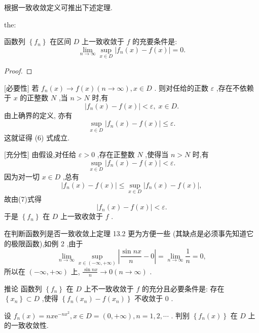根据一致收敛定义可推出下述定理.

\begin{theorem}{}{the:}

\end{theorem}
 函数列 \(\left\{  {f}_{n}\right\}\) 在区间 \(D\) 上一致收敛于 \(f\) 的充要条件是:
\[
\mathop{\lim }\limits_{{n \rightarrow  \infty }}\mathop{\sup }\limits_{{x \in  D}}\left| {{f}_{n}\left( x\right)  - f\left( x\right) }\right|  = 0. \tag{6}
\]
\begin{proof}

\end{proof}
[必要性] 若 \({f}_{n}\left( x\right)  \rightarrow  f\left( x\right) \left( {n \rightarrow  \infty }\right) ,x \in  D\) . 则对任给的正数 \(\varepsilon\) ,存在不依赖于 \(x\) 的正整数 \(N\) ,当 \(n > N\) 时,有
\[
\left| {{f}_{n}\left( x\right)  - f\left( x\right) }\right|  < \varepsilon ,\;x \in  D.
\]
由上确界的定义, 亦有
\[
\mathop{\sup }\limits_{{x \in  D}}\left| {{f}_{n}\left( x\right)  - f\left( x\right) }\right|  \leq  \varepsilon .
\]
这就证得 (6) 式成立.

[充分性] 由假设,对任给 \(\varepsilon  > 0\) ,存在正整数 \(N\) ,使得当 \(n > N\) 时,有
\[
\mathop{\sup }\limits_{{x \in  D}}\left| {{f}_{n}\left( x\right)  - f\left( x\right) }\right|  < \varepsilon . \tag{7}
\]
因为对一切 \(x \in  D\) ,总有
\[
\left| {{f}_{n}\left( x\right)  - f\left( x\right) }\right|  \leq  \mathop{\sup }\limits_{{x \in  D}}\left| {{f}_{n}\left( x\right)  - f\left( x\right) }\right| ,
\]
故由(7)式得
\[
\left| {{f}_{n}\left( x\right)  - f\left( x\right) }\right|  < \varepsilon .
\]
于是 \(\left\{  {f}_{n}\right\}\) 在 \(D\) 上一致收敛于 \(f\) .

在判断函数列是否一致收敛上定理 13.2 更为方便一些 (其缺点是必须事先知道它的极限函数),如例 2 ,由于
\[
\mathop{\lim }\limits_{{n \rightarrow  \infty }}\mathop{\sup }\limits_{{x \in  \left( {-\infty , + \infty }\right) }}\left| {\frac{\sin {nx}}{n} - 0}\right|  = \mathop{\lim }\limits_{{n \rightarrow  \infty }}\frac{1}{n} = 0,
\]
所以在 \(\left( {-\infty , + \infty }\right)\) 上, \(\frac{\sin {nx}}{n} \rightarrow  0\left( {n \rightarrow  \infty }\right)\) .

推论 函数列 \(\left\{  {f}_{n}\right\}\) 在 \(D\) 上不一致收敛于 \(f\) 的充分且必要条件是: 存在 \(\left\{  {x}_{n}\right\}   \subset  D\) ,使得 \(\left\{  {{f}_{n}\left( {x}_{n}\right)  - f\left( {x}_{n}\right) }\right\}\) 不收敛于 0 .

\begin{example}

\end{example}
设 \({f}_{n}\left( x\right)  = {nx}{\mathrm{e}}^{-n{x}^{2}},x \in  D = \left( {0, + \infty }\right) ,n = 1,2,\cdots\) . 判别 \(\left\{  {{f}_{n}\left( x\right) }\right\}\) 在 \(D\) 上的一致收敛性.

